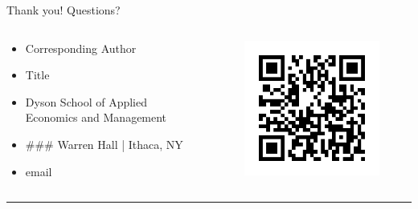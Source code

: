 \documentclass[usenames,dvipsnames]{beamer}
\begin{document}
\begin{frame}
    \centering
    \vspace{40pt}
    \huge Thank you! Questions?
    \vspace{20pt}
    \begin{columns}
        \begin{column}{.6\textwidth}
            \normalsize
            \begin{itemize}
                \item[]Corresponding Author
                \item[]Title
                \item[]Dyson School of Applied Economics and Management
                \item[]\#\#\# Warren Hall | Ithaca, NY
                \item[]email
            \end{itemize}
        \end{column}
        \begin{column}{.4\textwidth}
            \begin{figure}
                \raggedright
                \includegraphics[width=0.7\linewidth]{Images/QR_code_for_mobile_English_Wikipedia.png}
            \end{figure}
        \end{column}
    \end{columns}
    \vspace{20pt}
    \begin{columns}
        \begin{column}{0.9\textwidth}\centering \hrule
        \end{column}

\end{columns}
\end{frame}
\end{document}
